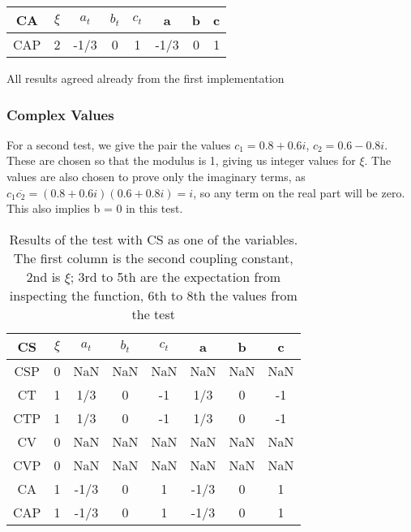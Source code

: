 \documentclass[twocolumn]{article}
\begin{document}
\begin{table}[H]
	\begin{tabular}{|c|c|c|c|c|c|c|c|}
		\hline
		CA & $\xi $& $a_t$ & $b_t$ & $c_t$ & a & b & c \\
		\hline
		CAP & 2 &  -1/3 & 0 & 1  & -1/3  & 0 & 1   \\
		\hline
	\end{tabular}
\end{table}

All results agreed already from the first implementation

\subsubsection{Complex Values}

For a second test, we give the pair the values $c_1 = 0.8 + 0.6i$, $c_2 = 0.6 - 0.8i$. These are chosen so that the modulus is 1, giving us integer values for $\xi$. The values are also chosen to prove only the imaginary terms, as $c_1\overline{c_2} = (0.8+0.6i)(0.6+0.8i) = i$, so any term on the real part will be zero. This also implies b = 0  in this test.

\begin{table}[H]
	\begin{tabular}{|c|c|c|c|c|c|c|c|}
		\hline
		CS & $\xi $& $a_t$ & $b_t$ & $c_t$ & a & b & c \\
		\hline
		CSP & 0 & NaN & NaN & NaN  & NaN & NaN & NaN   \\
		\hline
		CT & 1 & 1/3 & 0 & -1 & 1/3  & 0  & -1\\
		\hline
		CTP & 1 & 1/3 & 0 & -1  & 1/3  & 0  &  -1\\
		\hline
		CV & 0 & NaN & NaN & NaN  & NaN & NaN & NaN   \\
		\hline
		CVP & 0 & NaN & NaN & NaN  & NaN & NaN & NaN   \\
		\hline
		CA & 1 & -1/3 & 0 & 1  & -1/3  & 0  &  1\\
		\hline
		CAP & 1 & -1/3  & 0 & 1  & -1/3 & 0 & 1\\
		\hline
	\end{tabular}
	\caption{Results of the test with CS as one of the variables. The first column is the second coupling constant, 2nd is $\xi$; 3rd to 5th are the expectation from inspecting the function, 6th to 8th the values from the test}
\end{table}
\end{document}
